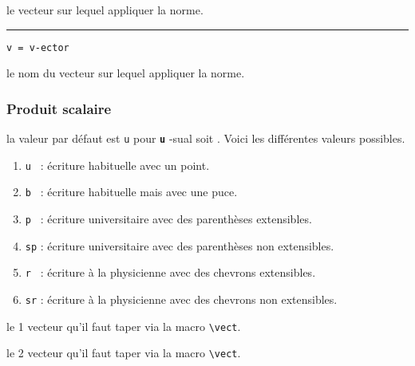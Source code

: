 \documentclass[12pt,a4paper]{article}
\makeatletter
\newcommand\env[1]{\texttt{#1}}
\newcommand\macro[1]{\env{\textbackslash{}#1}}
\theoremstyle{definition}
\newcommand\separation{
	\medskip
	\hfill\rule{0.5\textwidth}{0.75pt}\hfill
	\medskip
}
\newcommand\whyprefix[2]{%
	\textbf{\prefix{#1}}-#2%
}
\newcommand\mwhyprefix[2]{%
	\texttt{#1 = #1-#2}%
}
\newcommand\prefix[1]{%
	\texttt{#1}%
}
\newcommand\inenglish{\@ifstar{\@inenglish@star}{\@inenglish@no@star}}
\newcommand\@inenglish@star[1]{%
	\emph{\og #1 \fg}%
}
\newcommand\@inenglish@no@star[1]{%
	\@inenglish@star{#1} en anglais%
}
\makeatother
\begin{document}
\IDarg{} le vecteur sur lequel appliquer la norme.


\separation

 \hfill \mwhyprefix{v}{ector}

\IDarg{} le nom du vecteur sur lequel appliquer la norme.


\subsubsection{Produit scalaire}




\IDoption{} la valeur par défaut est \verb+u+ pour \whyprefix{u}{sual} soit \inenglish{habituel}.  Voici les différentes valeurs possibles.

\begin{enumerate}
	\item \verb+u + : écriture habituelle avec un point.

	\item \verb+b + : écriture habituelle mais avec une puce.

	\medskip
	
	\item \verb+p + : écriture \og universitaire \fg{} avec des parenthèses extensibles.

	\item \verb+sp+ : écriture \og universitaire \fg{} avec des parenthèses non extensibles.

	\medskip
	
	\item \verb+r + : écriture \og à la physicienne \fg{} avec des chevrons extensibles.

	\item \verb+sr+ : écriture \og à la physicienne \fg{} avec des chevrons non extensibles.

%
%
\end{enumerate}

 le 1\ier{} vecteur qu'il faut taper via la macro \macro{vect}.

 le 2\ieme{} vecteur qu'il faut taper via la macro \macro{vect}.
\end{document}
